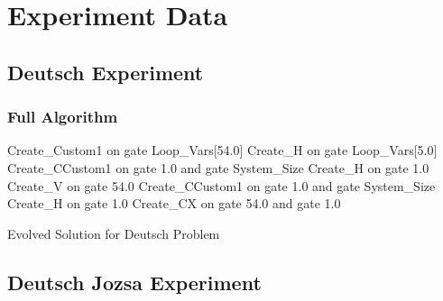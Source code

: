 \chapter{Experiment Data}

\section{Deutsch Experiment}
\label{sec:DeutschExpApp}
\subsection{Full Algorithm}
\label{sec:DeutschExpAppFullAlg}

\begin{algorithm}
 \begin{algorithmic}
\STATE Create\_Custom1 on gate Loop\_Vars[54.0]
\STATE Create\_H on gate Loop\_Vars[5.0]
\STATE Create\_CCustom1 on gate 1.0 and gate System\_Size
\STATE Create\_H on gate 1.0
\STATE Create\_V on gate 54.0
\STATE Create\_CCustom1 on gate 1.0 and gate System\_Size
\STATE Create\_H on gate 1.0
\STATE Create\_CX on gate 54.0 and gate 1.0
 \end{algorithmic}
\caption{Evolved Solution for Deutsch Problem}
\label{alg:evodeutsch}
\end{algorithm}








\clearpage
\section{Deutsch Jozsa Experiment}
\label{sec:deutschjozsa}

